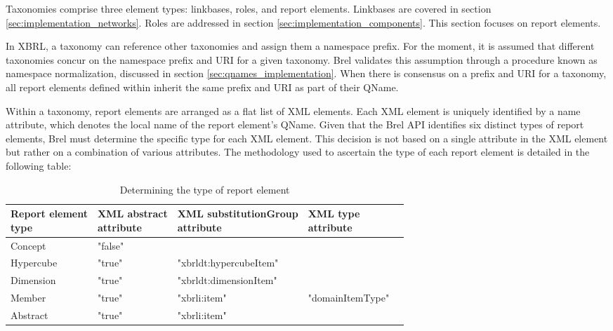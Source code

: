 Taxonomies comprise three element types: linkbases, roles, and report elements.
Linkbases are covered in section \ref{sec:implementation_networks}.
Roles are addressed in section \ref{sec:implementation_components}.
This section focuses on report elements.

In XBRL, a taxonomy can reference other taxonomies and assign them a namespace prefix.
For the moment, it is assumed that different taxonomies concur on the namespace prefix and URI for a given taxonomy.
Brel validates this assumption through a procedure known as namespace normalization, discussed in section \ref{sec:qnames_implementation}.
When there is consensus on a prefix and URI for a taxonomy, all report elements defined within inherit the same prefix and URI as part of their QName.

Within a taxonomy, report elements are arranged as a flat list of XML elements.
Each XML element is uniquely identified by a name attribute, which denotes the local name of the report element's QName.
Given that the Brel API identifies six distinct types of report elements, Brel must determine the specific type for each XML element.
This decision is not based on a single attribute in the XML element but rather on a combination of various attributes.
The methodology used to ascertain the type of each report element is detailed in the following table:

\begin{table}[H]
    \centering
    \begin{tabular}{|l|l|l|l|l|}
        \hline
        \makecell[l]{\textbf{Report element} \\ \textbf{type}}  & 
        \makecell[l]{\textbf{XML abstract} \\ \textbf{attribute}} &
        \makecell[l]{\textbf{XML substitutionGroup} \\ \textbf{attribute}} & 
        \makecell[l]{\textbf{XML type} \\ \textbf{attribute}} \\ \hline
        Concept     & "false"   &                                      &                            \\ \hline
        Hypercube   & "true"    & "xbrldt:hypercubeItem"                &                            \\ \hline
        Dimension   & "true"    & "xbrldt:dimensionItem"                &                            \\ \hline
        Member      & "true"    & "xbrli:item"                          & "domainItemType" \\ \hline
        Abstract    & "true"    & "xbrli:item"                          &                            \\ \hline
    \end{tabular}
    \caption{Determining the type of report element}
    \label{tab:determining_report_element_type}
\end{table}

